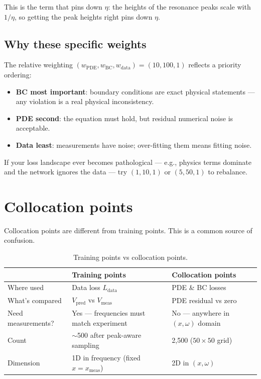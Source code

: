 \documentclass[11pt,a4paper]{article}
\begin{document}
This is the term that pins down $\eta$: the heights of the resonance peaks scale with $1/\eta$, so getting the peak heights right pins down $\eta$.

\subsection{Why these specific weights}

The relative weighting $(w_\text{PDE}, w_\text{BC}, w_\text{data}) = (10, 100, 1)$ reflects a priority ordering:
\begin{itemize}[leftmargin=*, itemsep=2pt]
\item \textbf{BC most important}: boundary conditions are exact physical statements --- any violation is a real physical inconsistency.
\item \textbf{PDE second}: the equation must hold, but residual numerical noise is acceptable.
\item \textbf{Data least}: measurements have noise; over-fitting them means fitting noise.
\end{itemize}
If your loss landscape ever becomes pathological --- e.g., physics terms dominate and the network ignores the data --- try $(1, 10, 1)$ or $(5, 50, 1)$ to rebalance.

\section{Collocation points}

Collocation points are different from training points. This is a common source of confusion.

\begin{table}[h]
\centering
\small
\begin{tabularx}{\linewidth}{l X X}
\toprule
& \textbf{Training points} & \textbf{Collocation points} \\
\midrule
Where used      & Data loss $L_\text{data}$ & PDE \& BC losses \\
What's compared & $V_\text{pred}$ vs $V_\text{meas}$ & PDE residual vs zero \\
Need measurements? & Yes --- frequencies must match experiment & No --- anywhere in $(x, \omega)$ domain \\
Count           & $\sim$500 after peak-aware sampling & 2{,}500 ($50 \times 50$ grid) \\
Dimension       & 1D in frequency (fixed $x = x_\text{meas}$) & 2D in $(x, \omega)$ \\
\bottomrule
\end{tabularx}
\caption{Training points vs collocation points.}
\end{table}
\end{document}
